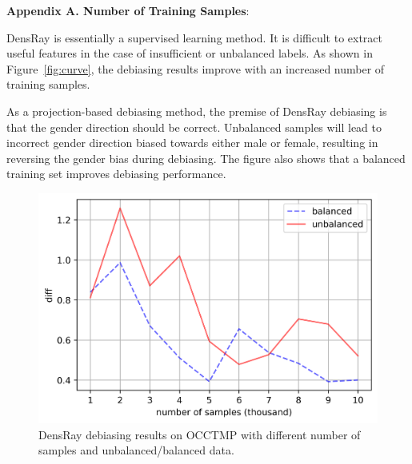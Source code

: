 \documentclass[11pt]{article}
\def\figref#1{Figure~\ref{fig:#1}}
\def\figlabel#1{\label{fig:#1}\label{p:#1}}
\begin{document}

{\bf Appendix A. Number of Training Samples}:


 DensRay is essentially a supervised learning method. It is difficult to extract useful features in the case of insufficient or unbalanced labels.  As shown in \figref{curve}, the debiasing results improve with an increased number of training samples.

As a projection-based debiasing method, the premise of DensRay debiasing is that the gender direction should be correct. Unbalanced samples will lead to incorrect gender direction biased towards either male or female, resulting in reversing the gender bias during debiasing. The figure also shows that a balanced training set improves debiasing performance.
\begin{figure}[h]
	\centering
	\footnotesize
	\vspace{0cm}  
	\setlength{\abovecaptionskip}{0.2cm}   
	\setlength{\belowcaptionskip}{0cm}
	\includegraphics[width=0.4\linewidth]{samples}
	\caption{DensRay debiasing results on OCCTMP with different number of samples and unbalanced/balanced data.}
 
	\figlabel{curve}
\end{figure}
\end{document}
